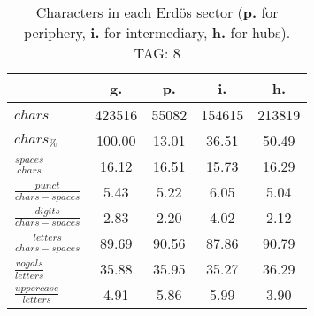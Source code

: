 \begin{table}[h!]
\begin{center}
\begin{tabular}{| l || c | c | c | c |}\hline
 & {\bf g.} & {\bf p.} & {\bf i.} & {\bf h.} \\\hline\hline
$chars$ & 423516  & 55082  & 154615  & 213819 \\
$chars_{\%}$ & 100.00  & 13.01  & 36.51  & 50.49 \\\hline
$\frac{spaces}{chars}$ & 16.12  & 16.51  & 15.73  & 16.29 \\
$\frac{punct}{chars-spaces}$ & 5.43  & 5.22  & 6.05  & 5.04 \\
$\frac{digits}{chars-spaces}$ & 2.83  & 2.20  & 4.02  & 2.12 \\\hline
$\frac{letters}{chars-spaces}$ & 89.69  & 90.56  & 87.86  & 90.79 \\
$\frac{vogals}{letters}$ & 35.88  & 35.95  & 35.27  & 36.29 \\
$\frac{uppercase}{letters}$ & 4.91  & 5.86  & 5.99  & 3.90 \\\hline
\end{tabular}
\caption{Characters in each Erd\"os sector ({{\bf p.}} for periphery, {{\bf i.}} for intermediary, 
    {{\bf h.}} for hubs). TAG: 8}
\end{center}
\end{table}